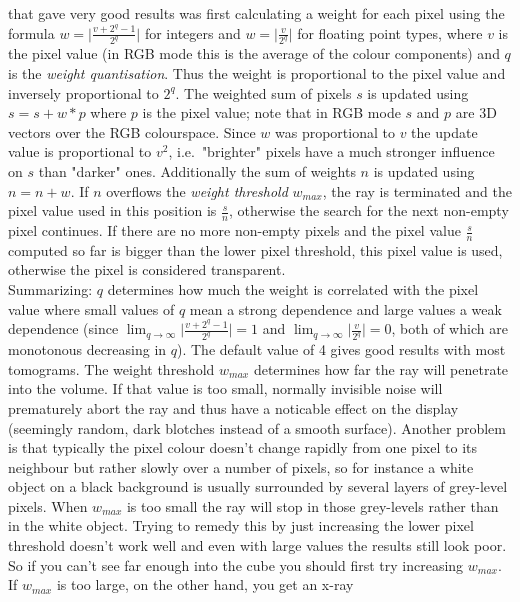 \documentclass[11pt]{article}
\begin{document}
that gave very good results was first calculating a weight for each pixel
using the formula $w = \vert \frac{v + 2^q - 1}{2^q} \vert$ for integers and
$w = \vert \frac{v}{2^q} \vert$ for floating point types, where $v$ is the
pixel value (in RGB mode this is the average of the colour components) and $q$
is the \emph{weight quantisation}. Thus the weight is proportional to the pixel
value and inversely proportional to $2^q$. The weighted sum of pixels $s$ is updated
using $s = s + w*p$ where $p$ is the pixel value; note that in RGB mode $s$ and
$p$ are 3D vectors over the RGB colourspace. Since $w$ was proportional
to $v$ the update value is proportional to $v^2$, i.e.\ "brighter" pixels have
a much stronger influence on $s$ than "darker" ones. Additionally the sum of
weights $n$ is updated using $n = n + w$. If $n$ overflows the \emph{weight
threshold} $w_{max}$, the ray is terminated and the pixel value used in this
position is $\frac{s}{n}$, otherwise the search for the next non-empty pixel
continues. If there are no more non-empty pixels and the pixel value $\frac{s}{n}$
computed so far is bigger than the lower pixel threshold, this pixel value is
used, otherwise the pixel is considered transparent.\\
Summarizing: $q$ determines how much the weight is correlated with the pixel
value where small values of $q$ mean a strong dependence and large values
a weak dependence (since
$\lim_{q \longrightarrow \infty}{\vert \frac{v + 2^q - 1}{2^q} \vert} = 1$ and
$\lim_{q \longrightarrow \infty}{\vert \frac{v}{2^q} \vert} = 0$, both of which
are monotonous decreasing in $q$).
The default value of 4 gives good results with most tomograms. The weight threshold
$w_{max}$ determines how far the ray will penetrate into the volume. If that
value is too small, normally invisible noise will prematurely abort the ray and
thus have a noticable effect on the display (seemingly random, dark blotches instead
of a smooth surface). Another problem is that typically the pixel colour doesn't
change rapidly from one pixel to its neighbour but rather slowly over a number
of pixels, so for instance a white object on a black background is usually surrounded
by several layers of grey-level pixels. When $w_{max}$ is too small the ray will stop
in those grey-levels rather than in the white object. Trying to remedy this by just increasing
the lower pixel threshold doesn't work well and even with large values the results
still look poor. So if you can't see far enough into the cube you should first try
increasing $w_{max}$. If $w_{max}$ is too large, on the other hand, you get an x-ray
\end{document}
